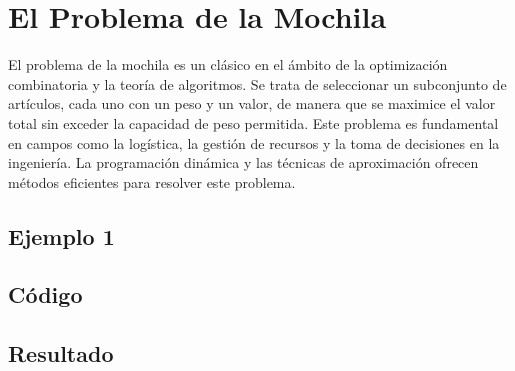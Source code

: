 \section{El Problema de la Mochila}
El problema de la mochila es un clásico en el ámbito de la optimización combinatoria y la teoría de algoritmos. Se trata de seleccionar un subconjunto de artículos, cada uno con un peso y un valor, de manera que se maximice el valor total sin exceder la capacidad de peso permitida. Este problema es fundamental en campos como la logística, la gestión de recursos y la toma de decisiones en la ingeniería. La programación dinámica y las técnicas de aproximación ofrecen métodos eficientes para resolver este problema.

\subsection{Ejemplo 1}

\subsection{Código}
\subsection{Resultado}
